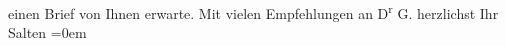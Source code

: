 \begin{ledgroupsized}[t]{13cm}
               einen Brief von Ihnen erwarte.\pend
           \pstart
           Mit vielen Empfehlungen an D\textsuperscript{r}{ }G. herzlichst\pend
           \pstart
           Ihr {\\[\baselineskip]}\spacefill\mbox{Salten}\pend
           \leftskip=0em{}
         
         \endnumbering{}\end{ledgroupsized}  \newcommand{\dateiname}{L03164}\newcommand{\titel}{Felix Salten an Arthur Schnitzler, 30. 8. 1895}\newcommand{\editorInnen}{Martin Anton Müller und Laura Untner}
      